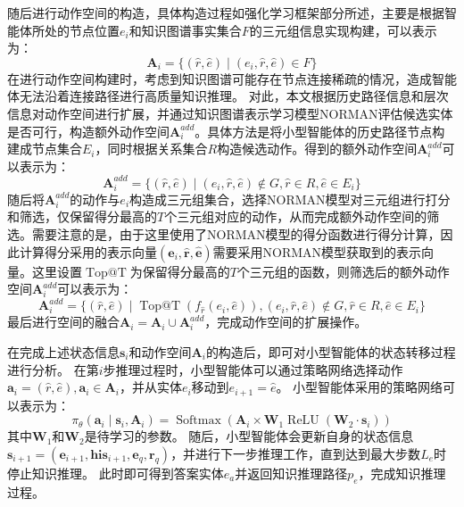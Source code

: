 \documentclass[algorithmlist, AutoFakeBold, AutoFakeSlant, figurelist, tablelist, nomlist, engineering, openany]{seuthesix} %
\begin{document}
随后进行动作空间的构造，具体构造过程如强化学习框架部分所述，主要是根据智能体所处的节点位置$e_i$和知识图谱事实集合$F$的三元组信息实现构建，可以表示为：
\begin{equation}
  \bm{A}_i = \{(\hat{r}, \hat{e}) \mid (e_i, \hat{r}, \hat{e}) \in F\}
  \label{base_1}
\end{equation}
在进行动作空间构建时，考虑到知识图谱可能存在节点连接稀疏的情况，造成智能体无法沿着连接路径进行高质量知识推理。
对此，本文根据历史路径信息和层次信息对动作空间进行扩展，并通过知识图谱表示学习模型NORMAN评估候选实体是否可行，构造额外动作空间$\bm{A}_{i}^{add}$。具体方法是将小型智能体的历史路径节点构建成节点集合$E_i$，同时根据关系集合$R$构造候选动作。得到的额外动作空间$\bm{A}_{i}^{add}$可以表示为：
\begin{equation}
  \bm{A}_{i}^{add} = \{(\hat{r}, \hat{e}) \mid (e_i, \hat{r}, \hat{e}) \notin G, \hat{r} \in R, \hat{e} \in E_i \}
  \label{extra_1}
\end{equation}
随后将$\bm{A}_{i}^{add}$的动作与$e_i$构造成三元组集合，选择NORMAN模型对三元组进行打分和筛选，仅保留得分最高的$T$个三元组对应的动作，从而完成额外动作空间的筛选。需要注意的是，由于这里使用了NORMAN模型的得分函数进行得分计算，因此计算得分采用的表示向量$(\bm{e}_i, \bm{\hat{r}}, \bm{\hat{e}})$需要采用NORMAN模型获取到的表示向量。这里设置$\operatorname{Top@T}$为保留得分最高的$T$个三元组的函数，则筛选后的额外动作空间$\bm{A}_{i}^{add}$可以表示为：
\begin{equation}
  \bm{A}_i^{add} = \{(\hat{r}, \hat{e}) \mid \operatorname{Top@T}(f_{\hat{r}}(e_i, \hat{e})), (e_i, \hat{r}, \hat{e}) \notin G, \hat{r} \in R, \hat{e} \in E_i \}
\end{equation}
最后进行空间的融合$\bm{A}_i = \bm{A}_i \cup \bm{A}_{i}^{add} $，完成动作空间的扩展操作。

在完成上述状态信息$\bm{s}_i$和动作空间$\bm{A}_i$的构造后，即可对小型智能体的状态转移过程进行分析。
在第$i$步推理过程时，小型智能体可以通过策略网络选择动作$\bm{a}_i = (\hat{r}, \hat{e}), \bm{a}_i \in \bm{A}_i$，并从实体$e_i$移动到$e_{i+1} = \hat{e}$。
小型智能体采用的策略网络可以表示为：
\begin{equation}
  \pi_\theta\left(\bm{a}_i \mid \bm{s}_i, \bm{A}_i\right) =\operatorname{Softmax}\left(\bm{A}_i \times \mathbf{W}_1 \operatorname{ReLU}\left(\mathbf{W}_2 \cdot \bm{s}_i\right)\right)
\end{equation}
其中$\mathbf{W}_1$和$\mathbf{W}_2$是待学习的参数。
随后，小型智能体会更新自身的状态信息$\bm{s}_{i+1} = (\bm{e}_{i+1}, \bm{his}_{i+1}, \bm{e}_q, \bm{r}_q)$，并进行下一步推理工作，直到达到最大步数$L_e$时停止知识推理。
此时即可得到答案实体$e_a$并返回知识推理路径$p_e$，完成知识推理过程。
\end{document}
